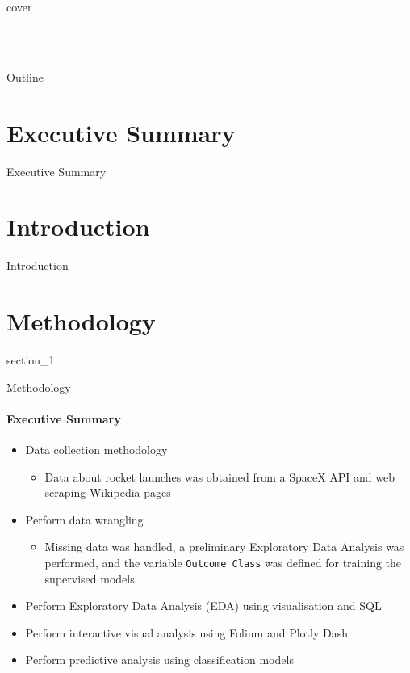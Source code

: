 {
{cover}
\begin{frame}
    \vspace{5cm}
    \textcolor{white}{Rogério Yamada \\ 22 September 2025}
\end{frame}
}

\begin{frame}{Outline}
    \tableofcontents
\end{frame}

\section{Executive Summary}

\begin{frame}{Executive Summary}

\end{frame}

\section{Introduction}

\begin{frame}{Introduction}

\end{frame}

\section{Methodology}

{
{section_1}
\begin{frame}[plain]
\end{frame}
}

\begin{frame}{Methodology}
    \framesubtitle{Executive Summary}
    \begin{itemize}
        \item Data collection methodology
        \begin{itemize}
            \item Data about rocket launches was obtained from a SpaceX API and web scraping Wikipedia pages
        \end{itemize}
        \item Perform data wrangling
        \begin{itemize}
            \item Missing data was handled, a preliminary Exploratory Data Analysis was performed, and the variable \texttt{Outcome Class} was defined for training the supervised models
        \end{itemize}
        \item Perform Exploratory Data Analysis (EDA) using visualisation and SQL
        \item Perform interactive visual analysis using Folium and Plotly Dash
        \item Perform predictive analysis using classification models
    \end{itemize}
\end{frame}

